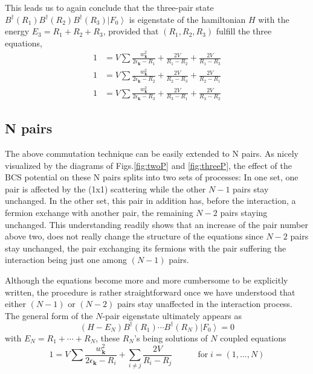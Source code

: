 \documentclass[aps,prb,superscriptaddress,twocolumn]{revtex4}
\begin{document}
This leads us to again conclude that the three-pair state $%
B^{\dagger}(R_1)B^{\dagger}(R_2)B^{\dagger}(R_3)\left|F_0\right>  $ is
eigenstate of the hamiltonian $H$ with the energy $E _3=R_1+R_2+R_3$,
provided that $\left(R_1,R_2, R_3\right) $ fulfill the three equations, 
\begin{equation}
\begin{split}
1&=V\sum\frac{w_{\mathbf{k} }^2}{2\epsilon_{\mathbf{k} }-R_1}+\frac{2V}{R_1-R_2%
}+\frac{2V}{R_1-R_3} \\
1&=V\sum\frac{w_{\mathbf{k} }^2}{2\epsilon_{\mathbf{k} }-R_2}+\frac{2V}{R_2-R_3%
}+\frac{2V}{R_2-R_1} \\
1&=V\sum\frac{w_{\mathbf{k} }^2}{2\epsilon_{\mathbf{k} }-R_3}+\frac{2V}{R_3-R_1%
}+\frac{2V}{R_3-R_2}
\end{split}%
\end{equation}

\subsection{N pairs}

The above commutation technique can be easily extended to N pairs. As nicely
visualized by the diagrams of Figs.\ref{fig:twoP} and \ref{fig:threeP}, the
effect of the BCS potential on these N pairs splits into two sets of processes:
In one set, one pair is affected by the (1x1) scattering while the other $N-1
$ pairs stay unchanged. In the other set, this pair in addition has, before the interaction, a fermion
exchange with another pair, the remaining $N-2$
pairs staying unchanged. This understanding readily shows that an increase of the pair number above two, does not really change the structure of the equations
since $N-2$ pairs stay unchanged, the pair exchanging its fermions with the
pair suffering the interaction being just one among $(N-1)$ pairs.

Although the equations become more and more cumbersome to be explicitly
written, the procedure is rather straightforward once we have understood
that either $(N-1)$ or $(N-2)$ pairs stay unaffected in the interaction process. The
general form of the $N$-pair eigenstate ultimately appears as 
\begin{equation}  \label{eq:SchThreeN}
(H-E _N)B^{\dagger}(R_1)\cdots{}B^{\dagger}(R_N)\left|F_0\right>  =0
\end{equation}
with $E _N=R_1+\cdots+R_N$, these $R_N$'s being solutions of $N$ coupled
equations 
\begin{equation}
1=V\sum\frac{w_{\mathbf{k} }^2}{2\epsilon_{\mathbf{k} }-R_i}+\sum_{i\neq{j}}%
\frac{2V}{R_i-R_j}\quad\qquad \text{for}\; i=\left(1,...,N\right) 
\end{equation}
\end{document}
